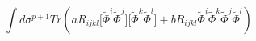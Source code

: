 \begin{equation}
\int d\sigma^{p+1}Tr(aR_{i j k
l}\lbrack\tilde\Phi^i\tilde\Phi^j\rbrack\lbrack\tilde\Phi^k\tilde\Phi^l\rbrack+bR_{i
j k l}\tilde\Phi^i\tilde\Phi^k\tilde\Phi^j\tilde\Phi^l)
\label{Rfi4}
\end{equation}


